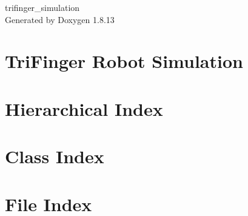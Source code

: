 \documentclass[twoside]{book}
\newcommand{\+}{\discretionary{\mbox{\scriptsize$\hookleftarrow$}}{}{}}
\newcommand{\clearemptydoublepage}{%
  \newpage{\pagestyle{empty}\cleardoublepage}%
}
\begin{document}
\hypersetup{pageanchor=false,
             bookmarksnumbered=true,
             pdfencoding=unicode
            }
\begin{titlepage}
\vspace*{7cm}
\begin{center}%
{\Large trifinger\+\_\+simulation }\\
\vspace*{1cm}
{\large Generated by Doxygen 1.8.13}\\
\end{center}
\end{titlepage}
\clearemptydoublepage
{}
\tableofcontents
\clearemptydoublepage
{}
\hypersetup{pageanchor=true}

\chapter{Tri\+Finger Robot Simulation}
\label{md_README}

\chapter{Hierarchical Index}

\chapter{Class Index}

\chapter{File Index}

\end{document}
